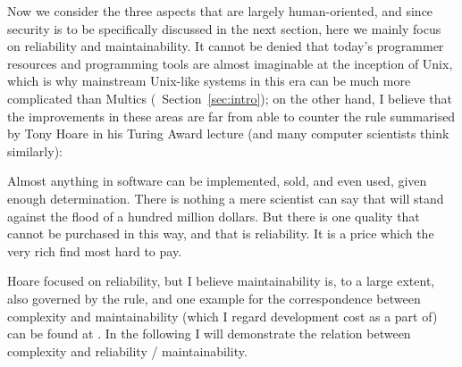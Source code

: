 Now we consider the three aspects that are largely human-oriented, and since
security is to be specifically discussed in the next section, here we mainly
focus on reliability and maintainability.  It cannot be denied that today's
programmer resources and programming tools are almost imaginable at the
inception of Unix, which is why mainstream Unix-like systems in this era
can be much more complicated than Multics (\cf~Section~\ref{sec:intro}); on
the other hand, I believe that the improvements in these areas are far from
able to counter the rule summarised by Tony Hoare in his Turing Award lecture%
 (and many computer scientists think similarly):
\begin{quoting}
	Almost anything in software can be implemented, sold, and even used, given
	enough determination.  There is nothing a mere scientist can say that will
	stand against the flood of a hundred million dollars.  But there is one
	quality that cannot be purchased in this way, and that is reliability.
	It is a price which the very rich find most hard to pay.
\end{quoting}
Hoare focused on reliability, but I believe maintainability is, to a large
extent, also governed by the rule, and one example for the correspondence
between complexity and maintainability (which I regard development cost as a
part of) can be found at \parencite{rbrander2017}.  In the following I will
demonstrate the relation between complexity and reliability / maintainability.

